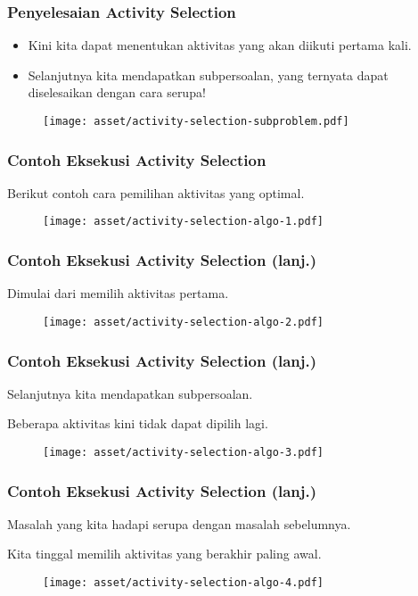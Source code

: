 \begin{frame}
  \frametitle{Penyelesaian Activity Selection}
  \begin{itemize}
    \item Kini kita dapat menentukan aktivitas yang akan diikuti pertama kali.
    \item Selanjutnya kita mendapatkan subpersoalan, yang ternyata dapat diselesaikan dengan cara serupa!
  \end{itemize}
  \begin{figure}
    \texttt{[image: asset/activity-selection-subproblem.pdf]}
  \end{figure}
\end{frame}

\begin{frame}
  \frametitle{Contoh Eksekusi Activity Selection}
  Berikut contoh cara pemilihan aktivitas yang optimal.
  \begin{figure}
    \texttt{[image: asset/activity-selection-algo-1.pdf]}
  \end{figure}
\end{frame}

\begin{frame}
  \frametitle{Contoh Eksekusi Activity Selection (lanj.)}
  Dimulai dari memilih aktivitas pertama.
  \begin{figure}
    \texttt{[image: asset/activity-selection-algo-2.pdf]}
  \end{figure}
\end{frame}

\begin{frame}
  \frametitle{Contoh Eksekusi Activity Selection (lanj.)}
  Selanjutnya kita mendapatkan subpersoalan.

  Beberapa aktivitas kini tidak dapat dipilih lagi.
  \begin{figure}
    \texttt{[image: asset/activity-selection-algo-3.pdf]}
  \end{figure}
\end{frame}

\begin{frame}
  \frametitle{Contoh Eksekusi Activity Selection (lanj.)}
  Masalah yang kita hadapi serupa dengan masalah sebelumnya.

  Kita tinggal memilih aktivitas yang berakhir paling awal.
  \begin{figure}
    \texttt{[image: asset/activity-selection-algo-4.pdf]}
  \end{figure}
\end{frame}

